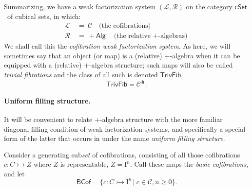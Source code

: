 \documentclass[11pt]{article}
\newcommand{\cSet}{\ensuremath{\mathsf{cSet}}}
\newcommand{\mono}{\ensuremath{\rightarrowtail}}
\newcommand{\I}{\ensuremath{\mathrm{I}}}
\theoremstyle{remark}
\theoremstyle{definition}
\begin{document}
Summarizing, we have a weak factorization system $(\mathcal{L}, \mathcal{R})$ on the category \cSet\ of cubical sets, in which:
\begin{align*}
\mathcal{L}\ &=\ \mathcal{C}\quad \text{(the cofibrations)}\\
\mathcal{R}\ &=\ +\mathsf{Alg}\quad \text{(the relative $+$-algebras)}
\end{align*}
We shall call this the \emph{cofibration weak factorization system}. As here, we will sometimes say that an object (or map) is a (relative) $+$-algebra when it can be equipped with a (relative) $+$-algebra structure; such maps will also be called \emph{trivial fibrations} and the class of all such is denoted $\mathsf{TrivFib}$,
\[
\mathsf{TrivFib} = \mathcal{C}^\pitchfork.
\]

\paragraph{Uniform filling structure.}

It will be convenient to relate $+$-algebra structure with the more familiar diagonal filling condition of weak factorization systems, and specifically a special form of the latter that occurs in \cite{CCHM} under the name \emph{uniform filling structure}. 

Consider a generating sub\emph{set} of cofibrations, consisting of all those cofibrations $c : C \mono Z$ where $Z$ is representable,  $Z=\I^n$.  Call these maps the \emph{basic cofibrations}, and let 
\begin{equation}\label{eq:basiccof}
\mathsf{BCof} = \{c : C\mono \I^n\,|\ c\in \mathcal{C}, n\geq 0 \}.
\end{equation}
\end{document}
